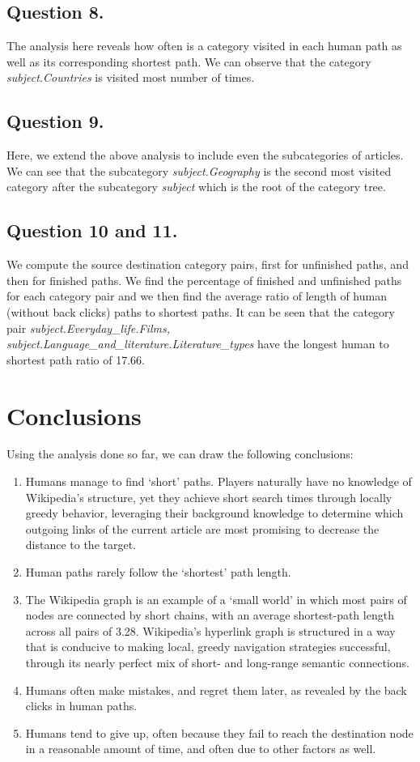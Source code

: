 \documentclass{article}
\begin{document}
\subsection{Question 8.}
The analysis here reveals how often is a category visited in each human path as well as its corresponding shortest path. We can observe that the category \textit{subject.Countries} is visited most number of times.
\subsection{Question 9.}
Here, we extend the above analysis to include even the subcategories of articles. We can see that the subcategory \textit{subject.Geography} is the second most visited category after the subcategory \textit{subject} which is the root of the category tree.
\subsection{Question 10 and 11.}
We compute the source destination category pairs, first for unfinished paths, and then for finished paths. We find the percentage of finished and unfinished paths for each category pair and  we then find the average ratio of length of human (without back clicks) paths to shortest paths. It can be seen that the category pair \textit{subject.Everyday\_life.Films, subject.Language\_and\_literature.Literature\_types} have the longest human to shortest path ratio of 17.66.
\section{Conclusions}
Using the analysis done so far, we can draw the following conclusions:
\begin{enumerate}
\item Humans manage to find ‘short' paths. Players naturally have no knowledge of Wikipedia’s structure, yet they achieve short search times through locally greedy behavior,
leveraging their background knowledge to determine which outgoing links of the
current article are most promising to decrease the distance to the target. 
\item Human paths rarely follow the ‘shortest' path length.
\item The Wikipedia graph is an example of a ‘small world’ in which most pairs of nodes are
connected by short chains, with an average shortest-path length  across all pairs of 3.28. Wikipedia’s hyperlink graph is structured in a way that is conducive to
making local, greedy navigation strategies successful, through its nearly perfect mix of short- and long-range semantic connections.
\item Humans often make mistakes, and regret them later, as revealed by the back clicks in human paths.
\item Humans tend to give up, often because they fail to reach the destination node in a reasonable amount of time, and often due to other factors as well.
\end{enumerate}
\end{document}
